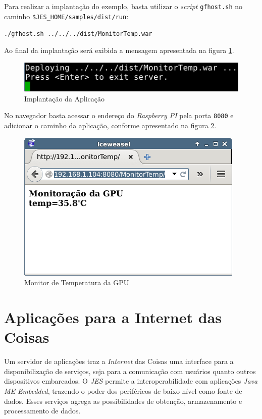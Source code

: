 Para realizar a implantação do exemplo, basta utilizar o \textit{script} \verb|gfhost.sh| no caminho \verb|$JES_HOME/samples/dist/run|:

\verb|./gfhost.sh ../../../dist/MonitorTemp.war|

Ao final da implantação será exibida a mensagem apresentada na figura \ref{fig:java-me/java-jes-deploy}.

\begin{figure}[H]
	\centering
	\includegraphics[width=0.7\linewidth]{figuras/java/java-jes-deploy.png}
	\caption{Implantação da Aplicação}
	\label{fig:java-me/java-jes-deploy}
\end{figure}

No navegador basta acessar o endereço do \textit{Raspberry PI} pela porta \verb|8080| e adicionar o caminho da aplicação, conforme apresentado na figura \ref{fig:java-me/java-jes-browser}.

\begin{figure}[H]
	\centering
	\includegraphics[width=0.7\linewidth]{figuras/java/java-jes-browser.png}
	\caption{Monitor de Temperatura da GPU}
	\label{fig:java-me/java-jes-browser}
\end{figure}

\section{Aplicações para a Internet das Coisas}

Um servidor de aplicações traz a \textit{Internet} das Coisas uma interface para a disponibilização de serviços, seja para a comunicação com usuários quanto outros dispositivos embarcados. O \textit{JES} permite a interoperabilidade com aplicações \textit{Java ME Embedded}, trazendo o poder dos periféricos de baixo nível como fonte de dados. Esses serviços agrega as possibilidades de obtenção, armazenamento e processamento de dados.

